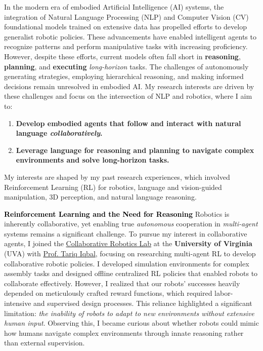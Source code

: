 \documentclass[10pt]{article}
\newcommand{\statement}[1]{\medskip\noindent
  \textcolor{black}{\textbf{#1}}\space
}
\begin{document}
\noindent In the modern era of embodied Artificial Intelligence (AI) systems, the integration of Natural Language Processing (NLP) and Computer Vision (CV) foundational models trained on extensive data has propelled efforts to develop generalist robotic policies. These advancements have enabled intelligent agents to recognize patterns and perform manipulative tasks with increasing proficiency. However, despite these efforts, current models often fall short in \textbf{reasoning}, \textbf{planning}, and \textbf{executing} \textit{long-horizon} tasks. The challenges of autonomously generating strategies, employing hierarchical reasoning, and making informed decisions remain unresolved in embodied AI. My research interests are driven by these challenges and focus on the intersection of NLP and robotics, where I aim to:
\begin{enumerate}[label=(\arabic*), itemindent=0pt, itemsep=0pt, parsep=0pt, nosep]
    \item \textbf{Develop embodied agents that follow and interact with natural language \textit{collaboratively}.}
    \item \textbf{Leverage language for reasoning and planning to navigate complex environments and solve long-horizon tasks.}
\end{enumerate}
My interests are shaped by my past research experiences, which involved Reinforcement Learning (RL) for robotics, language and vision-guided manipulation, 3D perception, and natural language reasoning.

\statement{Reinforcement Learning and the Need for Reasoning} Robotics is inherently collaborative, yet enabling true \textit{autonomous} cooperation in \textit{multi-agent} systems remains a significant challenge. To pursue my interest in collaborative agents, I joined the \href{https://www.collabrobotics.com/}{Collaborative Robotics Lab} at the \textbf{University of Virginia} (UVA) with  \href{https://www.tiqbal.com/}{Prof. Tariq Iqbal}, focusing on researching multi-agent RL to develop collaborative robotic policies. I developed simulation environments for complex assembly tasks and designed offline centralized RL policies that enabled robots to collaborate effectively. However, I realized that our robots' successes heavily depended on meticulously crafted reward functions, which required labor-intensive and supervised design processes. This reliance highlighted a significant limitation: \textit{the inability of robots to adapt to new environments without extensive human input}. Observing this, I became curious about whether robots could mimic how humans navigate complex environments through innate reasoning rather than external supervision.
\end{document}
